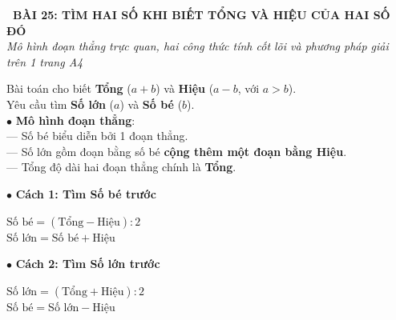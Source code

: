 \documentclass[14pt,a4paper,oneside]{extbook}
\begin{document}
\noindent
\begin{tcolorbox}[
  enhanced,
  colback=teal!8!white,
  colframe=teal!80!black,
  arc=3mm, boxrule=1pt,
  left=3mm, right=3mm, top=2mm, bottom=2mm,
  halign=center
]
  {\Large\bfseries\color{teal!90!black}\faBookmark\ BÀI 25: TÌM HAI SỐ KHI BIẾT TỔNG VÀ HIỆU CỦA HAI SỐ ĐÓ}\\[1.5pt]
  {\footnotesize\itshape\color{black!75} Mô hình đoạn thẳng trực quan, hai công thức tính cốt lõi và phương pháp giải trên 1 trang A4}
\end{tcolorbox}

\vspace{2mm}

\noindent
\begin{minipage}[t]{0.49\textwidth}
  \begin{tcolorbox}[
    enhanced,
    title={\footnotesize\bfseries\color{white}\faBalanceScale\ 1. Bản chất \& Mô hình đoạn thẳng},
    colback=blue!2!white,
    colframe=blue!75!black,
    arc=2.5mm, boxrule=0.8pt, top=1.8mm, bottom=1.8mm, left=2mm, right=2mm
  ]
    \footnotesize
    Bài toán cho biết \textbf{Tổng} ($a+b$) và \textbf{Hiệu} ($a-b$, với $a > b$).\\
    Yêu cầu tìm \textbf{Số lớn} ($a$) và \textbf{Số bé} ($b$).\\[1mm]
    $\bullet$ \textbf{Mô hình đoạn thẳng}:\\
    --- Số bé biểu diễn bởi 1 đoạn thẳng.\\
    --- Số lớn gồm đoạn bằng số bé \textbf{cộng thêm một đoạn bằng Hiệu}.\\
    --- Tổng độ dài hai đoạn thẳng chính là \textbf{Tổng}.
  \end{tcolorbox}
\end{minipage}%
\hfill
\begin{minipage}[t]{0.49\textwidth}
  \begin{tcolorbox}[
    enhanced,
    title={\footnotesize\bfseries\color{white}\faCalculator\ 2. Hai công thức giải cốt lõi},
    colback=teal!2!white,
    colframe=teal!75!black,
    arc=2.5mm, boxrule=0.8pt, top=1.8mm, bottom=1.8mm, left=2mm, right=2mm
  ]
    \footnotesize
    $\bullet$ \textbf{Cách 1: Tìm Số bé trước}
    \begin{center}
      \color{teal!85!black}\textbf{\large $\text{Số bé} = (\text{Tổng} - \text{Hiệu}) : 2$}\\[1mm]
      $\text{Số lớn} = \text{Số bé} + \text{Hiệu}$
    \end{center}
    $\bullet$ \textbf{Cách 2: Tìm Số lớn trước}
    \begin{center}
      \color{blue!85!black}\textbf{\large $\text{Số lớn} = (\text{Tổng} + \text{Hiệu}) : 2$}\\[1mm]
      $\text{Số bé} = \text{Số lớn} - \text{Hiệu}$
    \end{center}
  \end{tcolorbox}
\end{minipage}
\end{document}

